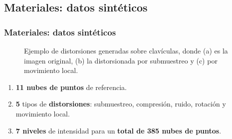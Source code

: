 \subsection{Materiales: datos sintéticos}
\begin{frame}
  \frametitle{Materiales: datos sintéticos}
  \vspace{-.8cm}
    \begin{figure}[htp]
      \caption{Ejemplo de distorsiones generadas sobre clavículas, donde (a) es la imagen original, 
      (b) la distorsionada por submuestreo y (c) por movimiento local.}
      \label{fig:DistorsionesGeneradas}
    \end{figure}
  \vspace{-.3cm}
    \begin{enumerate}
      \item \textbf{11 nubes de puntos} de referencia.  
      \item \textbf{5} tipos de \textbf{distorsiones}: 
        submuestreo, compresión, ruido, rotación y movimiento local.
      \item \textbf{7 niveles} de intensidad para un \textbf{total de 385 nubes de puntos}.
    \end{enumerate}
\end{frame}

